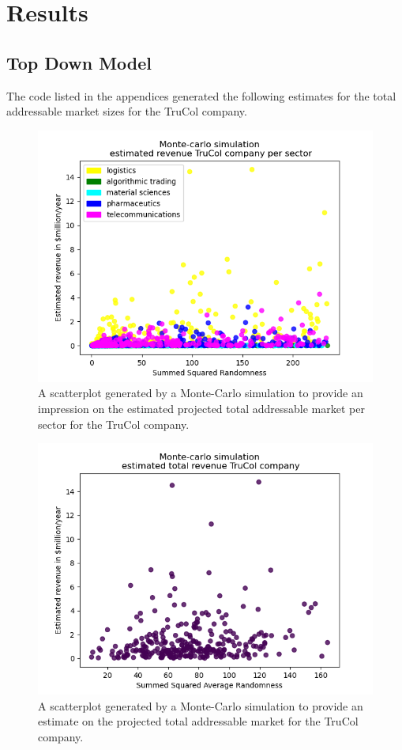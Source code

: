 \section{Results}\label{sec:results}
\subsection{Top Down Model}\label{subsec:results_top_down}
The code listed in the appendices generated the following estimates for the total addressable market sizes for the TruCol company.
\begin{figure}[H]
    \centering
    \includegraphics[width=0.5\linewidth]{Images/revenue_per_sector.png}
    \caption{A scatterplot generated by a Monte-Carlo simulation to provide an impression on the estimated projected total addressable market per sector for the TruCol company.}
    \label{fig:per_sector}
\end{figure}

\begin{figure}[H]
    \centering
    \includegraphics[width=0.5\linewidth]{Images/revenue_sum.png}
    \caption{A scatterplot generated by a Monte-Carlo simulation to provide an estimate on the projected total addressable market for the TruCol company.}
    \label{fig:summed}
\end{figure}